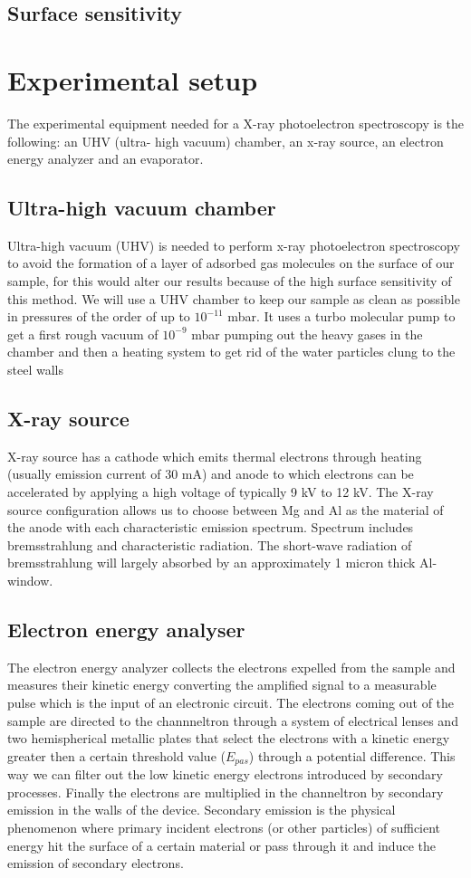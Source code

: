 \documentclass{article}
\begin{document}
\subsection{Surface sensitivity}

\section{Experimental setup}
The experimental equipment needed for a X-ray photoelectron spectroscopy is the following: an UHV (ultra-
high vacuum) chamber, an x-ray source, an electron energy analyzer and an evaporator.
\subsection{Ultra-high vacuum chamber}
Ultra-high vacuum (UHV) is needed to perform x-ray photoelectron spectroscopy to avoid the formation of
a layer of adsorbed gas molecules on the surface of our sample, for this would alter our results because of the high surface sensitivity of this method. We will use a UHV chamber to keep our sample as clean as possible in pressures of the order of up to $10^{-11}$ mbar. It uses a turbo molecular pump to get a first rough vacuum of $10^{-9}$ mbar pumping out the heavy gases in the chamber and then a heating system to get rid of the water particles clung to the steel walls
\subsection{X-ray source}
X-ray source has a cathode which emits thermal electrons through heating (usually emission current of 30 mA) and anode to which electrons can be accelerated by applying a high voltage of typically 9 kV to 12 kV. The X-ray source configuration allows us to choose between Mg and Al as the material of the anode with each characteristic emission spectrum. Spectrum includes bremsstrahlung and characteristic radiation. The short-wave radiation of bremsstrahlung will largely absorbed by an approximately 1 micron thick Al-window.
\subsection{Electron energy analyser}
The electron energy analyzer collects the electrons expelled from the sample and measures their kinetic
energy converting the amplified signal to a measurable pulse which is the input of an electronic circuit. The electrons coming out of the sample are directed to the channneltron through a system of electrical lenses and two hemispherical metallic plates that select the electrons with a kinetic energy greater then a certain threshold value ($E_{pas}$) through a potential difference. This way we can filter out the low kinetic energy electrons introduced by secondary processes. Finally the electrons are multiplied in the channeltron by secondary emission in the walls of the device. Secondary emission is the physical phenomenon where primary incident electrons (or other particles) of sufficient energy hit the surface of a certain material or pass through it and induce the emission of secondary electrons.
\end{document}
